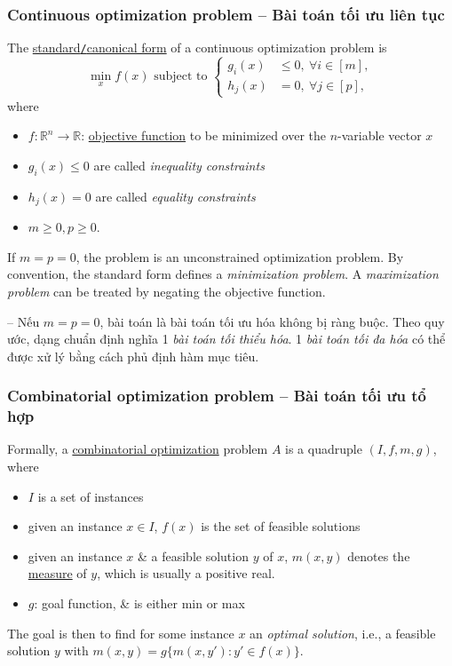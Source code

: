 \documentclass{article}
\begin{document}
\subsubsection{Continuous optimization problem -- Bài toán tối ưu liên tục}
The \href{https://en.wikipedia.org/wiki/Canonical_form}{standard{\tt/}canonical form} of a continuous optimization problem is
\begin{equation*}
	\min_x f(x)\mbox{ subject to }\left\{\begin{split}
		g_i(x)&\le0,\ \forall i\in[m],\\
		h_j(x) &= 0,\ \forall j\in[p],
	\end{split}\right.
\end{equation*}
where
\begin{itemize}
	\item $f:\mathbb{R}^n\to\mathbb{R}$: \href{https://en.wikipedia.org/wiki/Objective_function}{objective function} to be minimized over the $n$-variable vector $x$
	\item $g_i(x)\le0$ are called {\it inequality constraints}
	\item $h_j(x) = 0$ are called {\it equality constraints}
	\item $m\ge0,p\ge0$.
\end{itemize}
If $m = p = 0$, the problem is an unconstrained optimization problem. By convention, the standard form defines a {\it minimization problem}. A {\it maximization problem} can be treated by negating the objective function.

-- Nếu $m = p = 0$, bài toán là bài toán tối ưu hóa không bị ràng buộc. Theo quy ước, dạng chuẩn định nghĩa 1 {\it bài toán tối thiểu hóa}. 1 {\it bài toán tối đa hóa} có thể được xử lý bằng cách phủ định hàm mục tiêu.


\subsubsection{Combinatorial optimization problem -- Bài toán tối ưu tổ hợp}
Formally, a \href{https://en.wikipedia.org/wiki/Combinatorial_optimization}{combinatorial optimization} problem $A$ is a quadruple $(I,f,m,g)$, where
\begin{itemize}
	\item $I$ is a set of instances
	\item given an instance $x\in I$, $f(x)$ is the set of feasible solutions
	\item given an instance $x$ \& a feasible solution $y$ of $x$, $m(x,y)$ denotes the \href{https://en.wikipedia.org/wiki/Measure_(mathematics)}{measure} of $y$, which is usually a positive real.
	\item $g$: goal function, \& is either min or max
\end{itemize}
The goal is then to find for some instance $x$ an {\it optimal solution}, i.e., a feasible solution $y$ with $m(x,y) = g\{m(x,y'):y'\in f(x)\}$.
\end{document}
